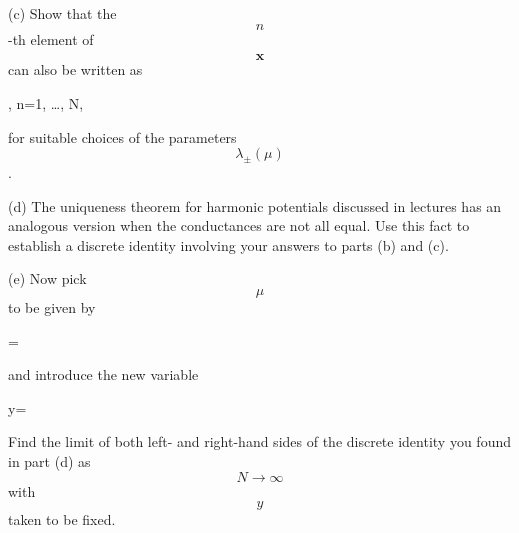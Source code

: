 \documentclass[10pt, a4paper]{article}
\begin{document}
\begin{Problem}
(c) Show that the $$n$$-th element of $$\hat{\mathbf{x}}$$ can also be written as

$$$$
, \quad n=1, \ldots, N,
$$$$

for suitable choices of the parameters $$\lambda_{ \pm}(\mu)$$.

(d) The uniqueness theorem for harmonic potentials discussed in lectures has an analogous version when the conductances are not all equal. Use this fact to establish a discrete identity involving your answers to parts (b) and (c).

(e) Now pick $$\mu$$ to be given by

$$$$
\mu=
$$$$

and introduce the new variable

$$$$
y=
$$$$

Find the limit of both left- and right-hand sides of the discrete identity you found in part (d) as $$N \rightarrow \infty$$ with $$y$$ taken to be fixed.
\end{Problem}
\end{document}
